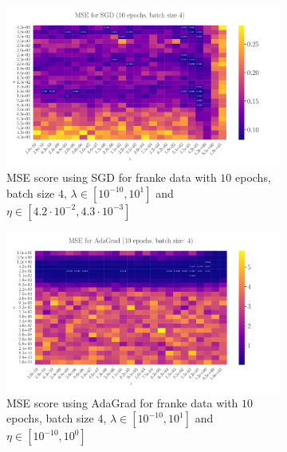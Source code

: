 \documentclass[%
reprint,s
amsmath,amssymb,
aps,
]{revtex4-2}
\begin{document}
\begin{figure}
	\begin{subfigure}{0.4353\textwidth}
		\includegraphics[width=\textwidth]{Python/Figures/LinRegSGD_25x25_epoch10_batchS4.pdf}
		\caption{MSE score using SGD for franke data with \(10\) epochs, batch size \(4\), \(\lambda\in[10^{-10}, 10^{1}]\) and \(\eta\in[4.2\cdot 10^{-2}, 4.3\cdot 10^{-3}]\)}
		\label{fig:LogReg25x25_epoch10_bacthS50}
	\end{subfigure}
	\hfill
	\begin{subfigure}{0.4353\textwidth}
		\includegraphics[width=\textwidth]{Python/Figures/LinRegAdaGrad_25x25_epoch10_batchS4.pdf}
		\caption{MSE score using AdaGrad for franke data with \(10\) epochs, batch size \(4\), \(\lambda\in[10^{-10}, 10^{1}]\) and \(\eta\in[10^{-10}, 10^{0}]\)}
		\label{fig:LogReg25x25_epoch10_bacthS50_zoomed}
	\end{subfigure}
\hfill\newline
	\begin{subfigure}{0.4353\textwidth}

\end{subfigure}
\end{figure}
\end{document}
